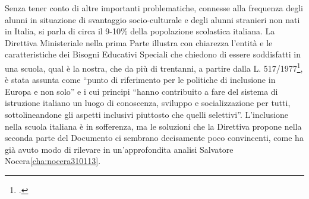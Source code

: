 Senza tener conto di altre importanti problematiche, connesse alla frequenza degli alunni in
situazione di svantaggio socio-culturale e degli alunni stranieri non nati in Italia, si parla di circa il
9-10\% della popolazione scolastica italiana.
La Direttiva Ministeriale nella prima Parte illustra con chiarezza l'entità e le caratteristiche dei
Bisogni Educativi Speciali che chiedono di essere soddisfatti in una scuola, qual è la nostra, che
da più di trentanni, a partire dalla L. 517/1977\footcite{Legge_517_77}, è stata assunta come “punto di riferimento per le
politiche di inclusione in Europa e non solo” e i cui principi “hanno contribuito a fare del sistema
di istruzione italiano un luogo di conoscenza, sviluppo e socializzazione per tutti, sottolineandone
gli aspetti inclusivi piuttosto che quelli selettivi”.
L'inclusione nella scuola italiana è in sofferenza, ma le soluzioni che la Direttiva propone nella
seconda parte del Documento ci sembrano decisamente poco convincenti, come ha già avuto
modo di rilevare in un'approfondita analisi Salvatore Nocera\ref{cha:nocera310113}.

